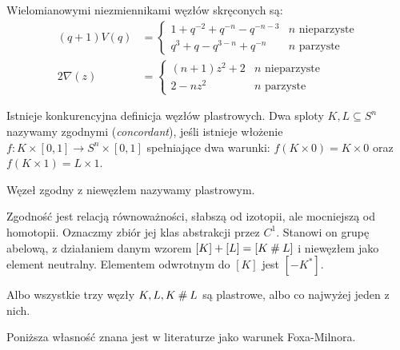 \begin{proposition}
    Wielomianowymi niezmiennikami węzłów skręconych są:
    \begin{align*}
    (q+1)V(q) & = \begin{cases}
        1+q^{-2}+q^{-n}-q^{-n-3} & n \mbox{ nieparzyste} \\
        q^{3}+q-q^{3-n}+q^{-n} & n \mbox{ parzyste}
    \end{cases} \\
    2 \nabla (z) & = \begin{cases}
        (n+1) z^{2} + 2 & n \mbox{ nieparzyste} \\
        2 - nz^2 & n \mbox{ parzyste}
    \end{cases}
    \end{align*}
\end{proposition}


Istnieje konkurencyjna definicja węzłów plastrowych.
Dwa sploty $K, L \subseteq S^n$ nazywamy zgodnymi (\emph{concordant}), jeśli istnieje włożenie $f \colon K \times [0,1] \to S^n \times [0,1]$ spełniające dwa warunki: $f(K \times 0) = K \times 0$ oraz $f(K \times 1) = L \times 1$.

\begin{definition} \label{def:slice_knot}
    Węzeł zgodny z niewęzłem nazywamy plastrowym.
\end{definition}

Zgodność jest relacją równoważności, słabszą od izotopii, ale mocniejszą od homotopii.
Oznaczmy zbiór jej klas abstrakcji przez $C^1$.
Stanowi on grupę abelową, z działaniem danym wzorem $[K] + [L] = [K \mathbin{\#} L]$ i niewęzłem jako element neutralny. 
Elementem odwrotnym do $[K]$ jest $[-K^*]$.

\begin{proposition}
    Albo wszystkie trzy węzły $K, L, K \mathbin{\#} L$ są plastrowe, albo co najwyżej jeden z nich.
\end{proposition}

Poniższa własność znana jest w literaturze jako warunek Foxa-Milnora. 

